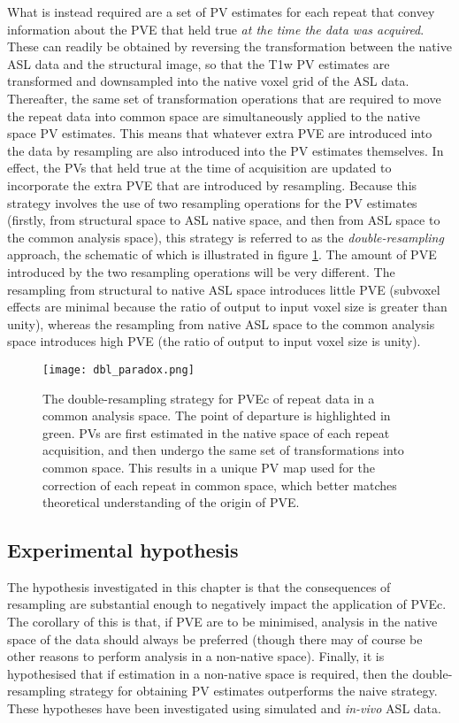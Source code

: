 What is instead required are a set of PV estimates for each repeat that convey information about the PVE that held true \textit{at the time the data was acquired}. These can readily be obtained by reversing the transformation between the native ASL data and the structural image, so that the T1w PV estimates are transformed and downsampled into the native voxel grid of the ASL data. Thereafter, the same set of transformation operations that are required to move the repeat data into common space are simultaneously applied to the native space PV estimates. This means that whatever extra PVE are introduced into the data by resampling are also introduced into the PV estimates themselves. In effect, the PVs that held true at the time of acquisition are updated to incorporate the extra PVE that are introduced by resampling. Because this strategy involves the use of two resampling operations for the PV estimates (firstly, from structural space to ASL native space, and then from ASL space to the common analysis space), this strategy is referred to as the \textit{double-resampling} approach, the schematic of which is illustrated in figure \ref{dbl_paradox}. The amount of PVE introduced by the two resampling operations will be very different. The resampling from structural to native ASL space introduces little PVE (subvoxel effects are minimal because the ratio of output to input voxel size is greater than unity), whereas the resampling from native ASL space to the common analysis space introduces high PVE (the ratio of output to input voxel size is unity). 

\begin{figure}
\centering
\texttt{[image: dbl\_paradox.png]}
\caption{The double-resampling strategy for PVEc of repeat data in a common analysis space. The point of departure is highlighted in green. PVs are first estimated in the native space of each repeat acquisition, and then undergo the same set of transformations into common space. This results in a unique PV map used for the correction of each repeat in common space, which better matches theoretical understanding of the origin of PVE.}
\label{dbl_paradox}
\end{figure} 


\subsection{Experimental hypothesis}
The hypothesis investigated in this chapter is that the consequences of resampling are substantial enough to negatively impact the application of PVEc. The corollary of this is that, if PVE are to be minimised, analysis in the native space of the data should always be preferred (though there may of course be other reasons to perform analysis in a non-native space). Finally, it is hypothesised that if estimation in a non-native space is required, then the double-resampling strategy for obtaining PV estimates outperforms the naive strategy. These hypotheses have been investigated using simulated and \textit{in-vivo} ASL data. 

